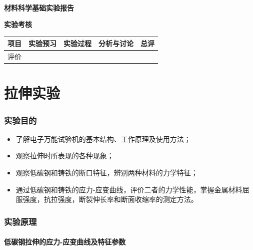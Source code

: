 \documentclass[a4paper,utf8]{article}
\begin{document}
\begin{center}
    {\mbox{}\\[7em]\bfseries\songti%
    材料科学基础实验报告}\\[34mm]
    {\bfseries\songti
    实验考核\\[3mm]
    \extrarowheight=3mm
    \begin{tabularx}{150mm}{|X|X|X|X|X|}\hline
        \hfil 项目 \hfil  & \hfil 实验预习 \hfil & \hfil 实验过程 \hfil & \hfil 分析与讨论 \hfil & \hfil 总评 \hfil \\[3mm] \hline
        \hfil 评价 \hfil &  &  &  &  \\[3mm] \hline
    \end{tabularx}
    }
\end{center}
\newpage
\part{拉伸实验}
\section{实验目的}
\begin{itemize}
    \item 了解电子万能试验机的基本结构、工作原理及使用方法；
    \item 观察拉伸时所表现的各种现象；
    \item 观察低碳钢和铸铁的断口特征，辨别两种材料的力学特征；
    \item 通过低碳钢和铸铁的应力-应变曲线，评价二者的力学性能，掌握金属材料屈服强度，抗拉强度，断裂伸长率和断面收缩率的测定方法。
\end{itemize}
\section{实验原理}%
\subsection{低碳钢拉伸的应力-应变曲线及特征参数}
\end{document}
